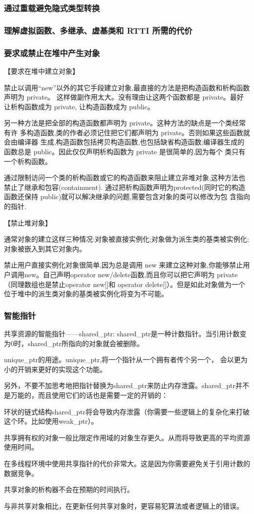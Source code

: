 \subsubsection{通过重载避免隐式类型转换}
\subsubsection{理解虚拟函数、多继承、虚基类和 RTTI 所需的代价}
\subsubsection{要求或禁止在堆中产生对象}

【要求在堆中建立对象】

禁止以调用“new”以外的其它手段建立对象,最直接的方法是把构造函数和析构函数声明为 private。 这样做副作用太大。没有理由让这两个函数都是 private。最好让析构函数成为 private, 让构造函数成为 public。

另一种方法是把全部的构造函数都声明为 private。这种方法的缺点是一个类经常有许 多构造函数,类的作者必须记住把它们都声明为 private。否则如果这些函数就会由编译器 生成,构造函数包括拷贝构造函数,也包括缺省构造函数;编译器生成的函数总是 public。因此仅仅声明析构函数为 private 是很简单的,因为每个 类只有一个析构函数。

通过限制访问一个类的析构函数或它的构造函数来阻止建立非堆对象,这种方法也禁止了继承和包容(containment). 通过把析构函数声明为protected(同时它的构造函数还保持 public)就可以解决继承的问题,需要包含对象的类可以修改为包
含指向的指针.

【禁止堆对象】

通常对象的建立这样三种情况:对象被直接实例化;对象做为派生类的基类被实例化; 对象被嵌入到其它对象内。

禁止用户直接实例化对象很简单,因为总是调用 new 来建立这种对象,你能够禁止用户调用new。自己声明operator new/delete函数,而且你可以把它声明为 private（同理数组也是禁止operator new[]和 operator delete[]）。但是如此对象做为一个位于堆中的派生类对象的基类被实例化将变为不可能。

\subsubsection{智能指针}
共享资源的智能指针——shared_ptr: shared_ptr是一种计数指针。当引用计数变为0时，shared_ptr所指向的对象就会被删除。

unique_ptr的用途。unique_ptr,将一个指针从一个拥有者传个另一个， 会以更为小的开销来更好的实现这个功能。

另外，不要不加思考地把指针替换为shared_ptr来防止内存泄露。shared_ptr并不是万能的，而且使用它们的话也是需要一定的开销的：
\begindot
\item 环状的链式结构shared_ptr将会导致内存泄露（你需要一些逻辑上的复杂化来打破这个环。比如使用weak_ptr）。
\item 共享拥有权的对象一般比限定作用域的对象生存更久。从而将导致更高的平均资源使用时间。
\item 在多线程环境中使用共享指针的代价非常大。这是因为你需要避免关于引用计数的数据竞争。
\item 共享对象的析构器不会在预期的时间执行。
\item 与非共享对象相比，在更新任何共享对象时，更容易犯算法或者逻辑上的错误。
\myenddot

